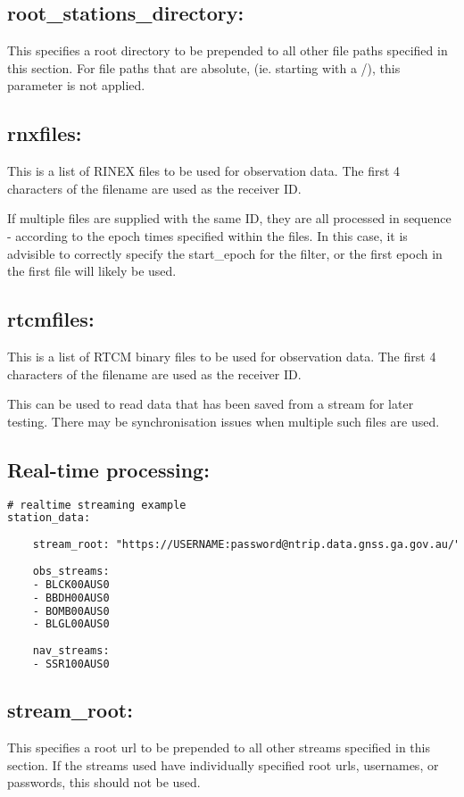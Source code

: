 \subsection{root\_stations\_directory:}
This specifies a root directory to be prepended to all other file paths specified in this section. For file paths that are absolute, (ie. starting with a /), this parameter is not applied.

\subsection{rnxfiles:}
This is a list of RINEX files to be used for observation data. The first 4 characters of the filename are used as the receiver ID.

If multiple files are supplied with the same ID, they are all processed in sequence - according to the epoch times specified within the files. In this case, it is advisible to correctly specify the start\_epoch for the filter, or the first epoch in the first file will likely be used.

\subsection{rtcmfiles:}
This is a list of RTCM binary files to be used for observation data. The first 4 characters of the filename are used as the receiver ID.

This can be used to read data that has been saved from a stream for later testing. There may be synchronisation issues when multiple such files are used.

\subsection{Real-time processing:}
\begin{lstlisting}[language=xml,caption=station\_data:]
# realtime streaming example
station_data:
	
	stream_root: "https://USERNAME:password@ntrip.data.gnss.ga.gov.au/"
	
	obs_streams:
	- BLCK00AUS0
	- BBDH00AUS0
	- BOMB00AUS0
	- BLGL00AUS0
	
	nav_streams:
	- SSR100AUS0
\end{lstlisting}


\subsection{stream\_root:}
This specifies a root url to be prepended to all other streams specified in this section. If the streams used have individually specified root urls, usernames, or passwords, this should not be used.

